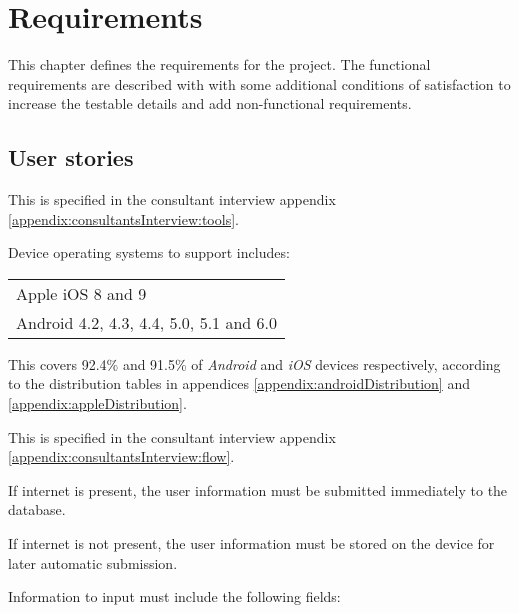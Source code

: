 \chapter{Requirements}\label{ch:Requirements}
This chapter defines the requirements for the project. 
The functional requirements are described with  with some additional conditions of satisfaction to increase the testable details and add non-functional requirements.

\section*{User stories}


This  is specified in the consultant interview appendix \ref{appendix:consultantsInterview:tools}.

Device operating systems to support includes: \newline
\begin{tabularx}{\textwidth}{X}
    Apple iOS 8 and 9 \\
    Android 4.2, 4.3, 4.4, 5.0, 5.1 and 6.0
\end{tabularx}

This covers 92.4\% and 91.5\% of \textit{Android} and \textit{iOS} devices respectively, according to the distribution tables in appendices \ref{appendix:androidDistribution} and \ref{appendix:appleDistribution}.


This  is specified in the consultant interview appendix \ref{appendix:consultantsInterview:flow}.

If internet is present, the user information must be submitted immediately to the database.

If internet is not present, the user information must be stored on the device for later automatic submission.

Information to input must include the following fields:\newline
{}

